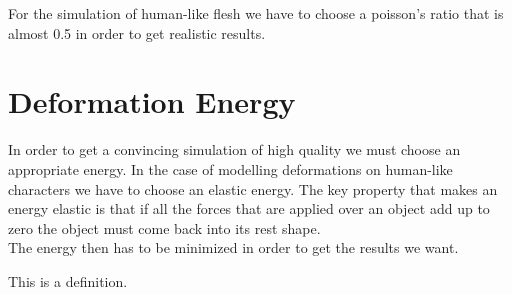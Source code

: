For the simulation of human-like flesh we have to choose a poisson's ratio that is almost 0.5 in order to get realistic results.
\\ 




\section{Deformation Energy}
In order to get a convincing simulation of high quality we must choose an appropriate energy. In the case of modelling deformations on human-like characters we have to choose an elastic energy. The key property that makes an energy elastic is that if all the forces that are applied over an object add up to zero the object must come back into its rest shape.
\\
The energy then has to be minimized in order to get the results we want.

\begin{definition}
  This is a definition.
\end{definition}







